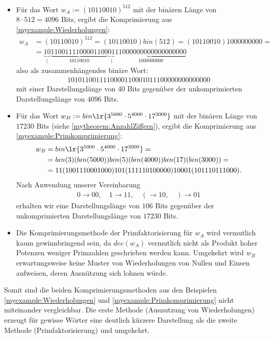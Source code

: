 \begin{myexample}\label{myexample:Unvergleichbarkeit}
	\leavevmode
\begin{itemize}
	\item Für das Wort $w_A := (10110010)^{512}$ mit der binären Länge von $8 \cdot 512 = 4096$ Bits, ergibt die Komprimierung aus \cref{myexample:Wiederholungen}:
\begin{align*}
	w_A &= (10110010)^{512} = (10110010)bin(512) = (10110010)1000000000 =\\
	&= \underbrace{10}_{(}\underbrace{1100111100001100}_{10110010}\underbrace{01}_{)}\underbrace{11000000000000000000}_{1000000000}
\end{align*}
also als zusammenhängendes binäre Wort:
\begin{align*}
	1010110011110000110001011100000000000000
\end{align*}
mit einer Darstellungslänge von $40$ Bits gegenüber der unkomprimierten Darstellungslänge von $4096$ Bits.
	\item Für das Wort $w_B := bin\lr{3^{5000}\cdot 5^{4000}\cdot 17^{3000}}$ mit der binären Länge von $17230$ Bits (siehe \cref{mytheorem:AnzahlZiffern}), ergibt die Komprimierung aus \cref{myexample:Primkomprimierung}:
\begin{align*}
	w_B &= bin\lr{3^{5000}\cdot 5^{4000}\cdot 17^{3000}} =\\
	&= bin(3)(bin(5000))bin(5)(bin(4000))bin(17)(bin(3000)) =\\
	&= 11(1001110001000)101(111110100000)10001(101110111000).
\end{align*}
Nach Anwendung unserer Vereinbarung
\begin{align*}
	0 \to 00, \quad 1 \to 11, \quad ( \to 10, \quad ) \to 01
\end{align*}
erhalten wir eine Darstellungslänge von $106$ Bits gegenüber der unkomprimierten Darstellungslänge von $17230$ Bits.
	\item Die Komprimierungsmethode der Primfaktorisierung für $w_A$ wird vermutlich kaum gewinnbringend sein, da $dec(w_A)$ vermutlich nicht als Produkt hoher Potenzen weniger Primzahlen geschrieben werden kann. Umgekehrt wird $w_B$ erwartungsweise keine Muster von Wiederholungen von Nullen und Einsen aufweisen, deren Ausnützung sich lohnen würde.
\end{itemize}
\end{myexample}

Somit sind die beiden Komprimierungsmethoden aus den Beispielen \ref{myexample:Wiederholungen} und \ref{myexample:Primkomprimierung} nicht miteinander vergleichbar. Die erste Methode (Ausnutzung von Wiederholungen) erzeugt für gewisse Wörter eine deutlich
kürzere Darstellung als die zweite Methode (Primfaktorisierung) und umgekehrt.

